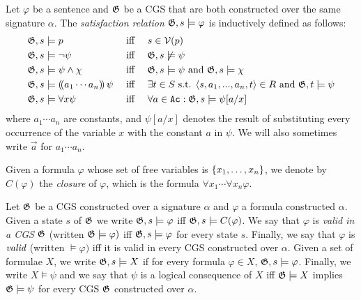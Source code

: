 \documentclass[sigconf,anonymous]{aamas}
\newcommand\rustam[1]{\todo[color=blue!30,size=\small,inline]{Rustam: #1}}
\newcommand\davide[1]{\todo[color=green!30,size=\small,inline]{Davide: #1}}
\begin{document}
\begin{definition}
Let $\varphi$ be a sentence and $\mathfrak{G}$ be a CGS that are both constructed over the same signature $\alpha$. 
 The \emph{satisfaction relation} $\mathfrak{G},s\models \varphi$ is inductively defined %
as follows: 
    \begin{alignat*}{3}
        &\mathfrak{G},s\models p &&\text{ iff } &&s\in \mathcal{V}(p)\\
        &\mathfrak{G},s\models \neg \psi &&\text{ iff } &&\mathfrak{G},s\not\models \psi\\
        &\mathfrak{G},s\models \psi \land \chi &&\text{ iff } &&\mathfrak{G},s\models \psi \text{ and } \mathfrak{G},s\models \chi\\
        &\mathfrak{G},s\models (\!( {a_1}\cdots {a_n} )\!)\, \psi &&\text{ iff } &&\exists t \in S \text{ s.t. } \langle s, {a_1}, ..., {a_n},t \rangle\in R \text{ and }\mathfrak{G},t\models  \psi\\
        &\mathfrak{G},s\models \forall x \psi &&\text{ iff } &&\forall a \in \texttt{Ac}: \mathfrak{G},s\models \psi[{a}/x]
    \end{alignat*}
\noindent where $a_1\cdots a_n$ are constants, and  $\psi[{a}/x]$ denotes 
the result of substituting every occurrence of the variable $x$ with the constant ${a}$ in $\psi$. We will also sometimes write $\vec a$ for $a_1\cdots a_n$.
\end{definition}  


\begin{definition}
    Given a formula $\varphi$ whose set of free variables is $\{x_1,\ldots,x_n\}$, we denote by $C(\varphi)$ the \emph{closure} of $\varphi$, which is the formula $\forall x_1\cdots \forall x_n \varphi$. %
\end{definition}


\begin{definition}

Let $\mathfrak{G}$ be a CGS constructed over a signature $\alpha$ and $\varphi$ a formula constructed $\alpha$. Given a state $s$ of $\mathfrak{G}$
    we write $\mathfrak{G},s\models \varphi$ iff $\mathfrak{G},s\models C(\varphi)$. We say that $\varphi$ is \emph{valid in a CGS} $\mathfrak{G}$ (written $\mathfrak{G}\models \varphi)$ iff $\mathfrak{G},s\models \varphi$ for every state $s$. Finally, we say that $\varphi$ is $\emph{valid}$ (written $\models \varphi)$ iff it is valid in every CGS constructed over $\alpha$. Given a set of formulae $X$, we write $\mathfrak{G},s \models X$  if for every  formula $\varphi\in X$, $\mathfrak{G}, s\models \varphi$. Finally, we write $X\models \psi$ and we say that $\psi$ is a logical consequence of $X$ iff $\mathfrak{G}\models X$ implies $\mathfrak{G}\models \psi$ for every CGS $\mathfrak{G}$ constructed over $\alpha$. %
\end{definition}
\end{document}
